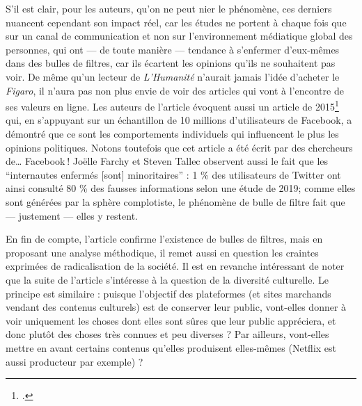 S’il est clair, pour les auteurs, qu’on ne peut nier le phénomène, ces derniers nuancent cependant son impact réel, car les études ne portent à chaque fois que sur un canal de communication et non sur l’environnement médiatique global des personnes, qui ont — de toute manière — tendance à s’enfermer d’eux-mêmes dans des bulles de filtres, car ils écartent les opinions qu’ils ne souhaitent pas voir. De même qu’un lecteur de \textit{L’Humanité} n’aurait jamais l’idée d’acheter le \textit{Figaro}, il n’aura pas non plus envie de voir des articles qui vont à l’encontre de ses valeurs en ligne. Les auteurs de l'article évoquent aussi un article de 2015\footcite{bakshy2015} qui, en s’appuyant sur un échantillon de 10 millions d’utilisateurs de Facebook, a démontré que ce sont les comportements individuels qui influencent le plus les opinions politiques. Notons toutefois que cet article a été écrit par des chercheurs de… Facebook ! Joëlle Farchy et Steven Tallec observent aussi le fait que les \enquote{internautes enfermés [sont] minoritaires} : 1 \% des utilisateurs de Twitter ont ainsi consulté 80 \% des fausses informations selon une étude de 2019; comme elles sont générées par la sphère complotiste, le phénomène de bulle de filtre fait que — justement — elles y restent.

En fin de compte, l’article confirme l’existence de bulles de filtres, mais en proposant une analyse méthodique, il remet aussi en question les craintes exprimées de radicalisation de la société. Il est en revanche intéressant de noter que la suite de l’article s’intéresse à la question de la diversité culturelle. Le principe est similaire : puisque l’objectif des plateformes (et sites marchands vendant des contenus culturels) est de conserver leur public, vont-elles donner à voir uniquement les choses dont elles sont sûres que leur public appréciera, et donc plutôt des choses très connues et peu diverses ? Par ailleurs, vont-elles mettre en avant certains contenus qu’elles produisent elles-mêmes (Netflix est aussi producteur par exemple) ?

